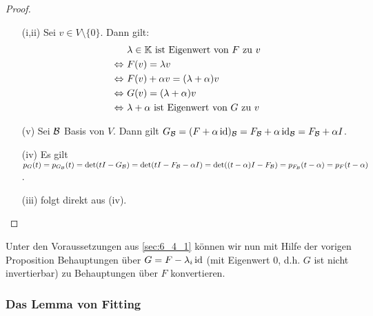 \begin{proof}\
	\begin{itemize}
		\item[(i,ii)]
			Sei $ v \in V \setminus \{ 0 \} $. Dann gilt:
			\begin{align*}
				&\ \text{$ \lambda \in \mathbb K $ ist Eigenwert von $ F $ zu $ v $} \\
				\Leftrightarrow&\ F(v) = \lambda v \\
				\Leftrightarrow&\ F(v) + \alpha v = (\lambda + \alpha)v \\
				\Leftrightarrow&\ G(v) = (\lambda + \alpha)v \\
				\Leftrightarrow&\ \text{$ \lambda + \alpha $ ist Eigenwert von $ G $ zu $ v $}
			\end{align*}
		\item[(v)]
			Sei $ \mathcal{B} $ Basis von $ V $. Dann gilt $ G_{\mathcal{B}} = (F + \alpha \operatorname{id})_{\mathcal{B}} = F_{\mathcal{B}} + \alpha \operatorname{id}_{\mathcal{B}} = F_{\mathcal{B}} + \alpha I $.
		\item[(iv)]
			Es gilt $ p_G(t) = p_{G_{\mathcal{B}}}(t) = \det(tI - G_{\mathcal{B}}) = \det(tI - F_{\mathcal{B}} - \alpha I) = \det((t-\alpha)I - F_{\mathcal{B}}) = p_{F_{\mathcal{B}}}(t-\alpha) = p_F(t-\alpha) $.
		\item[(iii)]
			folgt direkt aus (iv). \qedhere
	\end{itemize}
\end{proof}

\noindent Unter den Voraussetzungen aus \ref{sec:6_4_1} können wir nun mit Hilfe der vorigen Proposition Behauptungen über $ G = F - \lambda_i \operatorname{id} $ (mit Eigenwert 0, d.h. $ G $ ist nicht invertierbar) zu Behauptungen über $ F $ konvertieren.

\subsubsection{Das Lemma von Fitting}
\label{sec:6_4_4}

